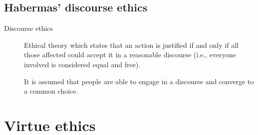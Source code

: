 \subsection{Habermas' discourse ethics}

\begin{description}
    \item[Discourse ethics] 
        Ethical theory which states that an action is justified if and only if all those affected could accept it in a reasonable discourse (i.e., everyone involved is considered equal and free).

        \begin{remark}
            It is assumed that people are able to engage in a discourse and converge to a common choice.
        \end{remark}
\end{description}



\section{Virtue ethics}

